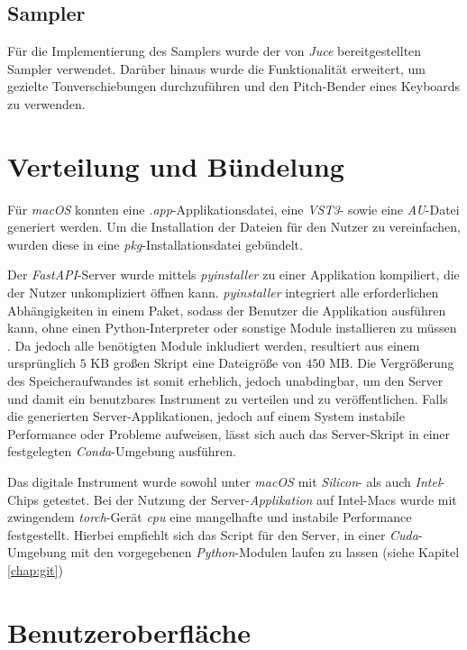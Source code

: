 \documentclass[
  a4paper,  %
  twoside,  %
  bibliography=totoc,
  headsepline,
  cleardoublepage=empty,
  parskip=half,
  draft=false
]{scrbook}
\begin{document}
\subsection{Sampler}

Für die Implementierung des Samplers wurde der von \emph{Juce} bereitgestellten Sampler \cite{noauthor_sampler_nodate} verwendet. Darüber hinaus wurde die Funktionalität erweitert, um gezielte Tonverschiebungen durchzuführen und den Pitch-Bender eines Keyboards zu verwenden.

\section{Verteilung und Bündelung}

Für \emph{macOS} konnten eine \emph{.app}-Applikationsdatei, eine \emph{VST3}- sowie eine \emph{AU}-Datei generiert werden. Um die Installation der Dateien für den Nutzer zu vereinfachen, wurden diese in eine \emph{pkg}-Installationsdatei gebündelt. 

Der \emph{FastAPI}-Server wurde mittels \emph{pyinstaller} \cite{noauthor_pyinstaller_nodate} zu einer Applikation kompiliert, die der Nutzer unkompliziert öffnen kann. \emph{pyinstaller} integriert alle erforderlichen Abhängigkeiten in einem Paket, sodass der Benutzer die Applikation ausführen kann, ohne einen Python-Interpreter oder sonstige Module installieren zu müssen \cite{noauthor_pyinstaller_nodate}. Da jedoch alle benötigten Module inkludiert werden, resultiert aus einem ursprünglich $5$ KB großen Skript eine Dateigröße von $450$ MB. Die Vergrößerung des Speicheraufwandes ist somit erheblich, jedoch unabdingbar, um den Server und damit ein benutzbares Instrument zu verteilen und zu veröffentlichen. Falls die generierten Server-Applikationen, jedoch auf einem System instabile Performance oder Probleme aufweisen, lässt sich auch das Server-Skript in einer festgelegten \emph{Conda}-Umgebung ausführen. 

Das digitale Instrument wurde sowohl unter \emph{macOS} mit \emph{Silicon}- als auch \emph{Intel}-Chips getestet. Bei der Nutzung der Server-\emph{Applikation} auf Intel-Macs wurde mit zwingendem \emph{torch}-Gerät \emph{cpu} eine mangelhafte und instabile Performance festgestellt. Hierbei empfiehlt sich das Script für den Server, in einer \emph{Cuda}-Umgebung mit den vorgegebenen \emph{Python}-Modulen laufen zu lassen (siehe Kapitel \ref{chap:git})

\section{Benutzeroberfläche}
\end{document}
